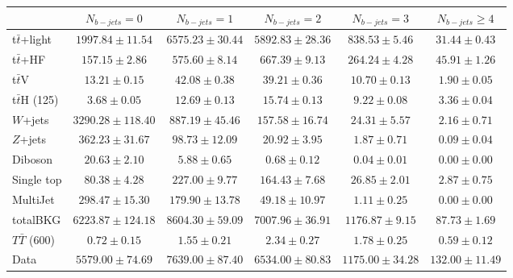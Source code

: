 \begin{tabular}{l c c c c c } \toprule
 & $N_{b-jets}= 0$ & $N_{b-jets}= 1$ & $N_{b-jets}= 2$ & $N_{b-jets}= 3$ & $N_{b-jets}\geq 4$ \\ \midrule 
 t$\bar{t}$+light & $1997.84 \pm 11.54$  & $6575.23 \pm 30.44$  & $5892.83 \pm 28.36$  & $838.53 \pm 5.46$  & $31.44 \pm 0.43$  \\ 
 t$\bar{t}$+HF & $157.15 \pm 2.86$  & $575.60 \pm 8.14$  & $667.39 \pm 9.13$  & $264.24 \pm 4.28$  & $45.91 \pm 1.26$  \\ \midrule 
 t$\bar{t}$V & $13.21 \pm 0.15$  & $42.08 \pm 0.38$  & $39.21 \pm 0.36$  & $10.70 \pm 0.13$  & $1.90 \pm 0.05$  \\ 
 t$\bar{t}$H (125) & $3.68 \pm 0.05$  & $12.69 \pm 0.13$  & $15.74 \pm 0.13$  & $9.22 \pm 0.08$  & $3.36 \pm 0.04$  \\ 
 $W$+jets & $3290.28 \pm 118.40$  & $887.19 \pm 45.46$  & $157.58 \pm 16.74$  & $24.31 \pm 5.57$  & $2.16 \pm 0.71$  \\ 
 $Z$+jets & $362.23 \pm 31.67$  & $98.73 \pm 12.09$  & $20.92 \pm 3.95$  & $1.87 \pm 0.71$  & $0.09 \pm 0.04$  \\ 
 Diboson & $20.63 \pm 2.10$  & $5.88 \pm 0.65$  & $0.68 \pm 0.12$  & $0.04 \pm 0.01$  & $0.00 \pm 0.00$  \\ 
 Single top & $80.38 \pm 4.28$  & $227.00 \pm 9.77$  & $164.43 \pm 7.68$  & $26.85 \pm 2.01$  & $2.87 \pm 0.75$  \\ 
 MultiJet & $298.47 \pm 15.30$  & $179.90 \pm 13.78$  & $49.18 \pm 10.97$  & $1.11 \pm 0.25$  & $0.00 \pm 0.00$  \\ \midrule 
 totalBKG & $6223.87 \pm 124.18$  & $8604.30 \pm 59.09$  & $7007.96 \pm 36.91$  & $1176.87 \pm 9.15$  & $87.73 \pm 1.69$  \\ \midrule 
 $T\bar{T}$ (600) & $0.72 \pm 0.15$  & $1.55 \pm 0.21$  & $2.34 \pm 0.27$  & $1.78 \pm 0.25$  & $0.59 \pm 0.12$  \\ \midrule 
 Data & $5579.00 \pm 74.69$  & $7639.00 \pm 87.40$  & $6534.00 \pm 80.83$  & $1175.00 \pm 34.28$  & $132.00 \pm 11.49$  \\ 
 \bottomrule\end{tabular}